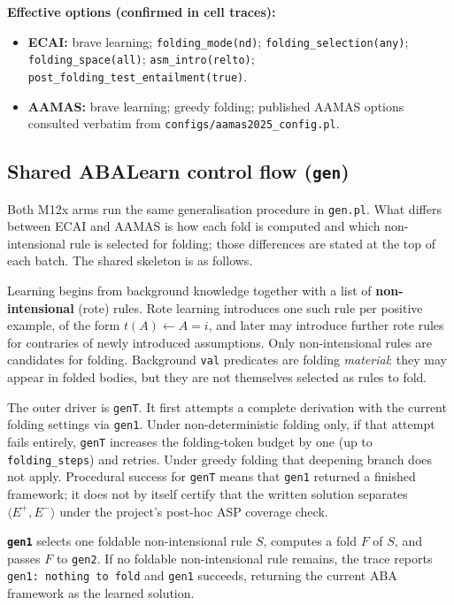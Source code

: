 \documentclass[11pt]{article}
\begin{document}
\textbf{Effective options (confirmed in cell traces):}

\begin{itemize}
  \item \textbf{ECAI:} brave learning; \texttt{folding\_mode(nd)}; \texttt{folding\_selection(any)}; \texttt{folding\_space(all)}; \texttt{asm\_intro(relto)}; \texttt{post\_folding\_test\_entailment(true)}.
  \item \textbf{AAMAS:} brave learning; greedy folding; published AAMAS options consulted verbatim from \texttt{configs/aamas2025\_config.pl}.
\end{itemize}

\subsection{Shared ABALearn control flow (\texttt{gen})}

Both M12x arms run the same generalisation procedure in \texttt{gen.pl}. What differs between ECAI and AAMAS is how each fold is computed and which non-intensional rule is selected for folding; those differences are stated at the top of each batch. The shared skeleton is as follows.

Learning begins from background knowledge together with a list of \textbf{non-intensional} (rote) rules. Rote learning introduces one such rule per positive example, of the form \(t(A) \leftarrow A=i\), and later may introduce further rote rules for contraries of newly introduced assumptions. Only non-intensional rules are candidates for folding. Background \texttt{val} predicates are folding \emph{material}: they may appear in folded bodies, but they are not themselves selected as rules to fold.

The outer driver is \texttt{genT}. It first attempts a complete derivation with the current folding settings via \texttt{gen1}. Under non-deterministic folding only, if that attempt fails entirely, \texttt{genT} increases the folding-token budget by one (up to \texttt{folding\_steps}) and retries. Under greedy folding that deepening branch does not apply. Procedural success for \texttt{genT} means that \texttt{gen1} returned a finished framework; it does not by itself certify that the written solution separates \(\langle E^+,E^-\rangle\) under the project's post-hoc ASP coverage check.

\textbf{\texttt{gen1}} selects one foldable non-intensional rule \(S\), computes a fold \(F\) of \(S\), and passes \(F\) to \texttt{gen2}. If no foldable non-intensional rule remains, the trace reports \texttt{gen1: nothing to fold} and \texttt{gen1} succeeds, returning the current ABA framework as the learned solution.
\end{document}
